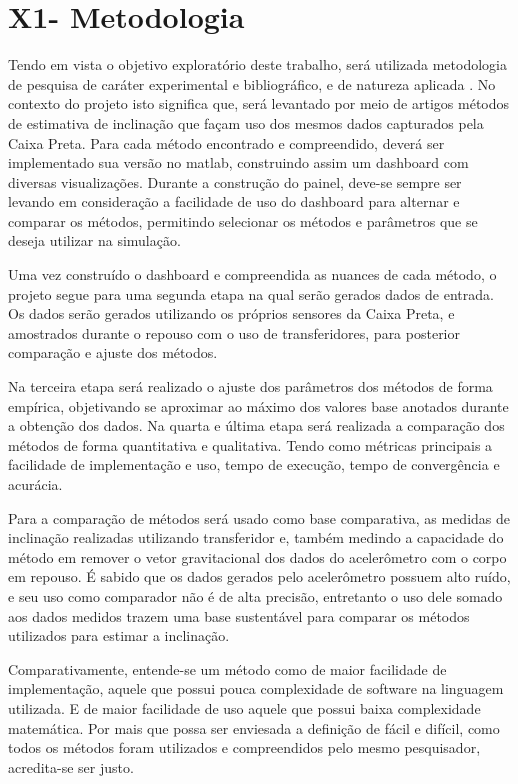 \section{X1- Metodologia}
Tendo em vista o objetivo exploratório deste trabalho, será utilizada metodologia de pesquisa de caráter experimental e bibliográfico, e de natureza aplicada \cite{tumelero_metodologia_2019, garcia_metodologia_nodate}. No contexto do projeto isto significa que, será levantado por meio de artigos métodos de estimativa de inclinação que façam uso dos mesmos dados capturados pela Caixa Preta. Para cada método encontrado e compreendido, deverá ser implementado sua versão no matlab, construindo assim um dashboard com diversas visualizações. Durante a construção do painel, deve-se sempre ser levando em consideração a facilidade de uso do dashboard para alternar e comparar os métodos, permitindo selecionar os métodos e parâmetros que se deseja utilizar na simulação.

Uma vez construído o dashboard e compreendida as nuances de cada método, o projeto segue para uma segunda etapa na qual serão gerados dados de entrada. Os dados serão gerados utilizando os próprios sensores da Caixa Preta, e amostrados durante o repouso com o uso de transferidores, para posterior comparação e ajuste dos métodos.

Na terceira etapa será realizado o ajuste dos parâmetros dos métodos de forma empírica, objetivando se aproximar ao máximo dos valores base anotados durante a obtenção dos dados. Na quarta e última etapa será realizada a comparação dos métodos de forma quantitativa e qualitativa. Tendo como métricas principais a facilidade de implementação e uso, tempo de execução, tempo de convergência e acurácia. 

Para a comparação de métodos será usado como base comparativa, as medidas de inclinação realizadas utilizando transferidor e, também medindo a capacidade do método em remover o vetor gravitacional dos dados do acelerômetro com o corpo em repouso. É sabido que os dados gerados pelo acelerômetro possuem alto ruído, e seu uso como comparador não é de alta precisão, entretanto o uso dele somado aos dados medidos trazem uma base sustentável para comparar os métodos utilizados para estimar a inclinação.

Comparativamente, entende-se um método como de maior facilidade de implementação, aquele que possui pouca complexidade de software na linguagem utilizada. E de maior facilidade de uso aquele que possui baixa complexidade matemática. Por mais que possa ser enviesada a definição de fácil e difícil, como todos os métodos foram utilizados e compreendidos pelo mesmo pesquisador, acredita-se ser justo.
